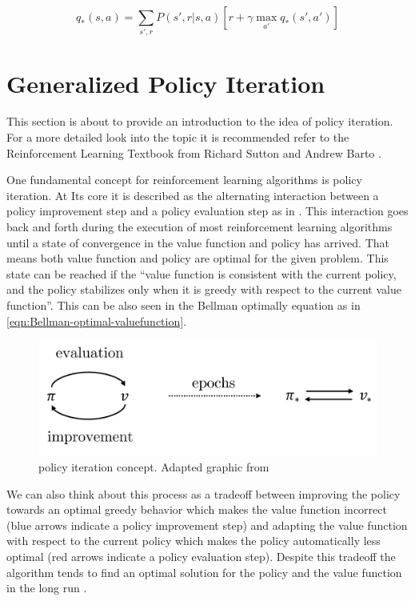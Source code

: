 \begin{equation}\label{eqn:Bellman-optimal-action-valuefunction}
	q_*(s, a) = \sum_{s', r} P(s', r|s, a)\left[r + \gamma \max_{a'} q_*(s', a')\right]
\end{equation}

\section{Generalized Policy Iteration}\label{sec:Generalized-Policy-Iteration}

This section is about to provide an introduction to the idea of policy iteration. For a more detailed look into the topic it is recommended refer to the Reinforcement Learning Textbook from Richard Sutton and Andrew Barto \cite{SuttonBartoRLBook}.

One fundamental concept for reinforcement learning algorithms is policy iteration. At Its core it is described as the alternating interaction between a policy improvement step and a policy evaluation step as in . This interaction goes back and forth during the execution of most reinforcement learning algorithms until a state of convergence in the value function and policy has arrived. That means both value function and policy are optimal for the given problem. This state can be reached if the ``value function is consistent with the current policy, and the policy stabilizes only when it is greedy with respect to the current value function''. This can be also seen in the Bellman optimally equation as in \eqref{eqn:Bellman-optimal-valuefunction}. 

% 
\begin{figure}
    \begin{center}
        \includegraphics[width=0.5\linewidth]{figures/background/PolicyIterationConcept.png}
        \caption[policy iteration concept]{policy iteration concept. Adapted graphic from \cite{SuttonBartoRLBook}}
        \label{fig:policy-iteration-concept}
    \end{center}
\end{figure}

We can also think about this process as a tradeoff between improving the policy towards an optimal greedy behavior which makes the value function incorrect (blue arrows indicate a policy improvement step) and adapting the value function with respect to the current policy which makes the policy automatically less optimal (red arrows indicate a policy evaluation step). Despite this tradeoff the algorithm tends to find an optimal solution for the policy and the value function in the long run \cite{SuttonBartoRLBook}.

